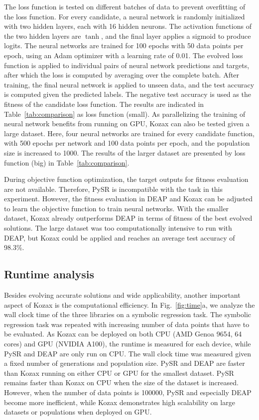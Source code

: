 \documentclass{article}
\begin{document}
The loss function is tested on different batches of data to prevent overfitting of the loss function. For every candidate, a neural network is randomly initialized with two hidden layers, each with 16 hidden neurons. The activation functions of the two hidden layers are $\tanh$, and the final layer applies a sigmoid to produce logits. The neural networks are trained for 100 epochs with 50 data points per epoch, using an Adam optimizer with a learning rate of 0.01. The evolved loss function is applied to individual pairs of neural network predictions and targets, after which the loss is computed by averaging over the complete batch.  After training, the final neural network is applied to unseen data, and the test accuracy is computed given the predicted labels. The negative test accuracy is used as the fitness of the candidate loss function. The results are indicated in Table~\ref{tab:comparison} as loss function (small). As parallelizing the training of neural network benefits from running on GPU, Kozax can also be tested given a large dataset. Here, four neural networks are trained for every candidate function, with 500 epochs per network and 100 data points per epoch, and the population size is increased to 1000. The results of the larger dataset are presented by loss function (big) in Table~\ref{tab:comparison}.

During objective function optimization, the target outputs for fitness evaluation are not available. Therefore, PySR is incompatible with the task in this experiment. However, the fitness evaluation in DEAP and Kozax can be adjusted to learn the objective function to train neural networks. With the smaller dataset, Kozax already outperforms DEAP in terms of fitness of the best evolved solutions. The large dataset was too computationally intensive to run with DEAP, but Kozax could be applied and reaches an average test accuracy of 98.3\%.

\subsection{Runtime analysis}
Besides evolving accurate solutions and wide applicability, another important aspect of Kozax is the computational efficiency. In Fig.~\ref{fig:time}a, we analyze the wall clock time of the three libraries on a symbolic regression task. The symbolic regression task was repeated with increasing number of data points that have to be evaluated. As Kozax can be deployed on both CPU (AMD Genoa 9654, 64 cores) and GPU (NVIDIA A100), the runtime is measured for each device, while PySR and DEAP are only run on CPU. The wall clock time was measured given a fixed number of generations and population size. PySR and DEAP are faster than Kozax running on either CPU or GPU for the smallest dataset. PySR remains faster than Kozax on CPU when the size of the dataset is increased. However, when the number of data points is 100000, PySR and especially DEAP become more inefficient, while Kozax demonstrates high scalability on large datasets or populations when deployed on GPU.
\end{document}
